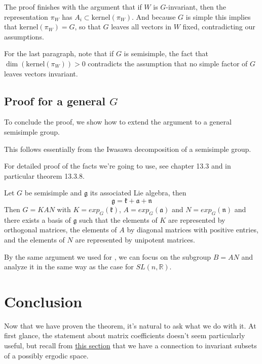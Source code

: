 \documentclass[
  12pt
]{article}
\numberwithin{equation}{section}
\theoremstyle{plain}
\newcommand{\G}{\ensuremath{G}\xspace}
\newcommand{\slnr}{\ensuremath{SL(n, \mathbb{R})}\xspace}
\newcommand{\frg}{\ensuremath{\mathfrak{g}}\xspace}
\newcommand{\frk}{\ensuremath{\mathfrak{k}}\xspace}
\newcommand{\fra}{\ensuremath{\mathfrak{a}}\xspace}
\newcommand{\frnn}{\ensuremath{\mathfrak{n}}\xspace}
\begin{document}
  The proof finishes with the argument that if $W$ is \G-invariant, then the
  representation $\pi_W$ has $A_i \subset \text{kernel}(\pi_W)$. And because \G
  is simple this implies that $\text{kernel}(\pi_W) = G$, so that \G leaves all
  vectors in $W$ fixed, contradicting our assumptions.

  For the last paragraph, note that if \G is semisimple, the fact that
  $\dim(\text{kernel}(\pi_W)) >0$ contradicts the assumption that no simple
  factor of \G leaves vectors invariant.




\hypertarget{proof-for-a-general-G}{%
\subsection{Proof for a general \texorpdfstring{$G$}{G}}\label{proof-for-a-general-G}}


   To conclude the proof, we show how to extend the argument to a general semisimple group.

   This follows essentially from the Iwasawa decomposition of a semisimple group.

   For detailed proof of the facts we're going to use, see \citeauthor{Hilgert2012}\cite{Hilgert2012} chapter 13.3 and in particular theorem 13.3.8.
   
   Let \G be semisimple and $\mathfrak{g}$ its associated Lie algebra, then 
   $$\frg = \frk + \fra + \frnn$$
   Then $G =KAN$ with $K=exp_G(\frk)$, $A=exp_G(\fra)$ and $N=exp_G(\frnn)$
   and there exists a basis of \frg such that the elements of $K$ are represented by orthogonal matrices, the elements of $A$ by diagonal matrices with positive entries, and the elements of $N$ are represented by unipotent matrices.

   By the same argument we used for , we can focus on the subgroup $B=AN$ and analyze it in the same way as the case for \slnr.




\hypertarget{outro}{%
\section{Conclusion}\label{outro}}


  Now that we have proven the theorem, it's natural to ask what we do with it.
  At first glance, the statement about matrix coefficients doesn't seem particularly useful,
  but recall from \hyperref[the-connection-between-ergodicity-and-unitary-representations]{this section}
  that we have a connection to invariant subsets of a possibly ergodic space.
\end{document}
